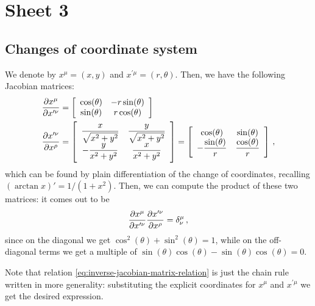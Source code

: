 \documentclass[main.tex]{subfiles}
\begin{document}
\section{Sheet 3}

\subsection{Changes of coordinate system}

We denote by \(x^{\mu } = (x, y)\) and \(x^{\prime \mu } = (r, \theta)\). Then, we have the following Jacobian matrices: 
%
\begin{subequations}
\begin{align}
  \pdv{x^{\mu }}{x^{\prime \nu }}  &= \left[\begin{array}{cc}
  \cos(\theta )  & -r \sin(\theta )  \\ 
  \sin(\theta )  & r \cos(\theta ) 
  \end{array}\right]  \\
  \pdv{x^{\prime \nu }}{x^{\rho }} &= \left[\begin{array}{cc}
  \displaystyle\frac{x}{\sqrt{x^2+y^2} } &\displaystyle \frac{y}{\sqrt{x^2+y^2} } \\ 
  \displaystyle -\frac{y}{x^2+y^2} &\displaystyle \frac{x}{x^2+y^2}
  \end{array}\right] 
  =
  \left[\begin{array}{cc}
  \cos(\theta )  & \sin(\theta )  \\ 
  \displaystyle- \frac{\sin( \theta ) }{r} & \displaystyle \frac{\cos(\theta ) }{r}
  \end{array}\right]
\,,
\end{align}
\end{subequations}
%
which can be found by plain differentiation of the change of coordinates, recalling \((\arctan x)' = 1/ (1+x^2)\). Then, we can compute the product of these two matrices: it comes out to be 
%
\begin{equation} \label{eq:inverse-jacobian-matrix-relation} 
  \pdv{x^{\mu }}{x^{\prime \nu }} \pdv{x^{\prime \nu }}{x^{\rho }} = \delta^{\mu }_{\nu }
\,,
\end{equation}
%
since on the diagonal we get \(\cos^2(\theta ) + \sin^2(\theta ) = 1\), while on the off-diagonal terms we get a multiple of \(\sin(\theta ) \cos(\theta ) - \sin(\theta ) \cos(\theta ) =0\).

Note that relation \eqref{eq:inverse-jacobian-matrix-relation} is just the chain rule written in more generality: substituting the explicit coordinates for \(x^{\mu }\) and \(x^{\prime \mu }\) we get the desired expression.
\end{document}
